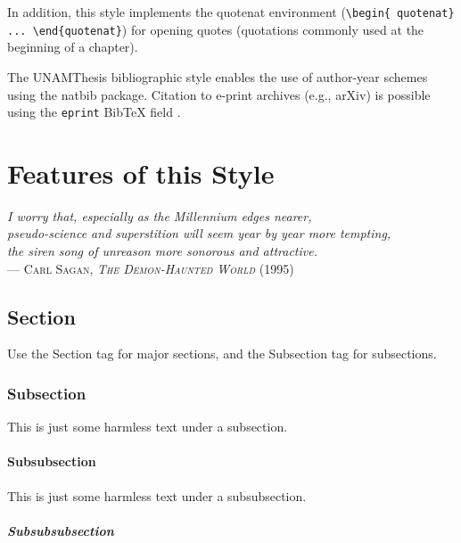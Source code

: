 \documentclass[11pt,spanish]{report}
\begin{document}
In addition, this style implements the quotenat environment (\texttt{\textbackslash{}begin\{
quotenat\} ... \textbackslash{}end\{quotenat\}}) for opening quotes (quotations commonly used
at the beginning of a chapter).

The UNAMThesis bibliographic style enables the use of author-year schemes using the natbib
package. Citation to e-print archives (e.g., arXiv) is possible using the \texttt{eprint}
{{\sc Bib}\TeX} field \citep{Keseler2005,Leskovec2008,Lipschutz1986,Marconi1967,
Neidhardt1996,Nelson2000}.

\chapter{Features of this Style}

\begin{quotenat}
\textsl{I worry that, especially as the Millennium edges nearer,\\
pseudo-science and superstition will seem year by year more tempting,\\
the siren song of unreason more sonorous and attractive.}\\
--- \textsc{Carl Sagan, \textit{The Demon-Haunted World} (1995)}

\end{quotenat}

\section{Section}

Use the Section tag for major sections, and the Subsection tag for subsections.

\subsection{Subsection}

This is just some harmless text under a subsection.

\subsubsection{Subsubsection}

This is just some harmless text under a subsubsection.

\paragraph{Subsubsubsection}
\end{document}
